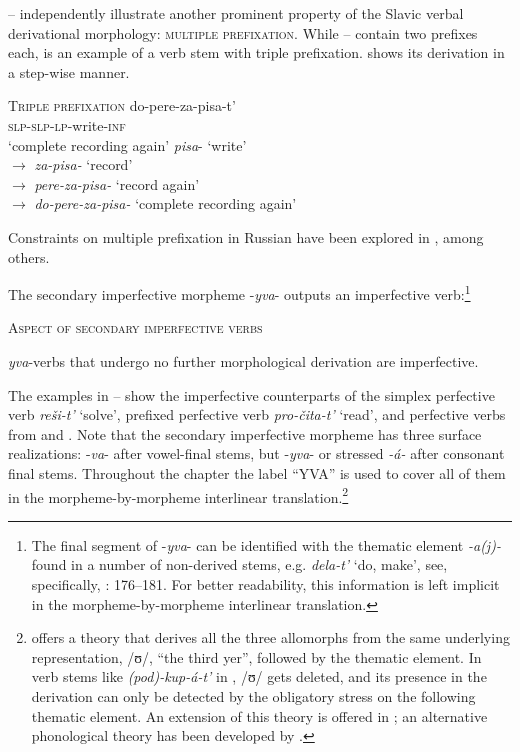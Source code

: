 \documentclass[output=paper,colorlinks,citecolor=brown]{langscibook}
\begin{document}
-- independently illustrate another prominent property of the Slavic verbal derivational morphology: \textsc{multiple prefixation}. While -- contain two prefixes each,  is an example of a verb stem with triple prefixation.  shows its derivation in a step-wise manner.

\ea   \textsc{Triple prefixation}\label{tat:ex:13}
\ea
\gll do-pere-za-pisa-t’ \\
    \textsc{slp-slp-lp}-write-\textsc{inf}\\
\glt  ‘complete recording again’\label{ex:tatevosov:13a}
\ex
      \textit{pisa}- ‘write’ \\$\rightarrow$ \textit{za}\textit{-pisa-} ‘record’ \\$\rightarrow$ \textit{pere}\textit{-za-pisa-} ‘record again’ \\$\rightarrow$
\textit{do}\textit{-pere-za-pisa-} ‘complete recording again’\label{ex:tatevosov:13b}
\z
\z

\noindent Constraints on multiple prefixation in Russian have been explored in \citet{Tatevosov2009,Tatevosov2013,Mueller-Reichau2021}, among others.

The secondary imperfective morpheme -\textit{yva}- outputs an imperfective verb:\footnote{The final segment of -\textit{yva}- can be identified with the thematic element \textit{-a(j)-} found in a number of non-derived stems, e.g. \textit{dela-t’} ‘do, make’, see, specifically, \citet{Isacenko1960}: 176--181. For better readability, this information is left implicit in the morpheme-by-morpheme interlinear translation.}  

\eanoraggedright   \textsc{Aspect of secondary imperfective verbs}\label{tat:ex:14}

  \textit{yva}-verbs that undergo no further morphological derivation are imperfective.
\z

\noindent The examples in -- show the imperfective counterparts of the simplex perfective verb \textit{reši-t'} ‘solve’, prefixed perfective verb \textit{pro-čita-t’} ‘read’, and perfective verbs from  and . Note that the secondary imperfective morpheme has three surface realizations: -\textit{va}- after vowel-final stems, but -\textit{yva}- or stressed \textit{-á-} after consonant final stems. Throughout the chapter the label “YVA” is used to cover all of them in the morpheme-by-morpheme interlinear translation.\footnote{\citet{Matushansky2009} offers a theory that derives all the three allomorphs from the same underlying representation, /ʊ/, “the third yer”, followed by the thematic element. In verb stems like \textit{(pod)-kup-á-t’} in , /ʊ/ gets deleted, and its presence in the derivation can only be detected by the obligatory stress on the following thematic element. An extension of this theory is offered in \citealt{Matushansky2021}; an alternative phonological theory has been developed by \citet{Enguehard2017}.}
\end{document}
